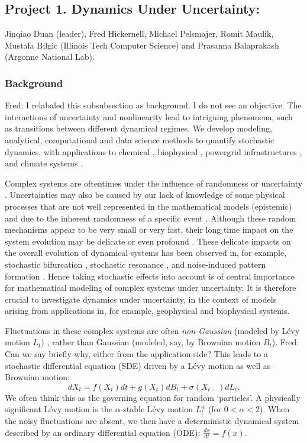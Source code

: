 \documentclass[11pt]{NSFamsart}
\newcommand{\FredNote}[1]{{\color{blue} Fred: #1}}
\begin{document}
\subsection*{Project 1. Dynamics  Under Uncertainty:} 
Jinqiao Duan (leader), Fred Hickernell, Michael Pelsmajer, Romit Maulik, Mustafa Bilgic (Illinois Tech Computer Science) and Prasanna Balaprakash (Argonne National Lab). 

\subsubsection*{Background} \FredNote{I relabaled this subsubsection as background.  I do not see an objective.} The interactions of uncertainty and nonlinearity lead to intriguing phenomena, such as  transitions   between  different dynamical regimes. We develop modeling, analytical, computational and data science  methods to quantify     stochastic dynamics, with applications to chemical \cite{agaoglou_chemical_2019}, biophysical \cite{Ruoff2018BiologicalCR}, powergrid infrastructures \cite{MEDJROUBI201714}, and climate systems \cite{Alexandrov2020NonlinearCD, Franzke2017NonlinearAS, Wan2020ADF}. 
 
Complex systems are oftentimes under the influence  of randomness or uncertainty \cite{Moss1, Horst, Gar, VanKampen3}. Uncertainties may also be caused by our lack of knowledge of some physical processes that are not well represented in the mathematical models (epistemic) and due to the inherent randomness of a specific event  \cite{Palmer1, Kantz, Wilks, Williams}.
Although these random mechanisms appear to be very small or very fast, their long time impact on the system evolution may be delicate or even profound \cite{Arnold, DuanBook2015}. These delicate impacts on the overall evolution of dynamical systems has been observed in, for example, stochastic bifurcation
\cite{Crauel, CarLanRob01, Horst}, stochastic resonance \cite{imkeller2002model},
 and  noise-induced pattern formation \cite{Gar, blomker2003pattern}.
Hence taking stochastic effects   into account is of
central importance for mathematical modeling of
complex systems under uncertainty.   It is therefore crucial to investigate dynamics under uncertainty, in the context of models arising from applications in, for example, geophysical and biophysical systems. 

Fluctuations in these complex systems are often \emph{non-Gaussian} (modeled by L\'evy motion $L_t$) \cite{Woy,Dit, Shlesinger,taqqu,dybiec2009levy}, rather than Gaussian (modeled, say, by Brownian motion $B_t$). \FredNote{Can we say briefly why, either from the application side?} This leads to a
 stochastic   differential equation (SDE)  \cite{Arnold,   Oksendal, DuanBook2015, Applebaum}
 driven by a L\'evy motion as well as Brownian motion:
 $$
 dX_t= f(X_t) dt + g(X_t) dB_t + \sigma(X_{t-}) dL_t.
 $$
 We often think this as the governing equation for random `particles'. A physically significant L\'evy motion is the  $\alpha$-stable L\'evy motion $L_t^\alpha$ (for $0<\alpha<2$).  
 When the noisy fluctuations are absent, we then have a   deterministic  dynamical system described by an ordinary differential equation (ODE): $ \frac{dx}{dt}=f(x).$
 
\end{document}
